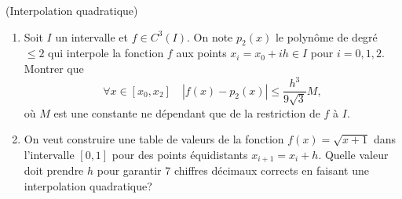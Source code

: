 \documentclass[a4paper,12pt,reqno]{amsart}
\begin{document}
\begin{exo} (Interpolation quadratique)
  \begin{enumerate}
    \item Soit $I$ un intervalle et $f\in C^3(I)$. On note $p_2(x)$ le polynôme de degré $\leq 2$ qui interpole la fonction $f$ aux points $x_i=x_0+ih \in I$ pour $i=0,1,2$. Montrer que
      $$
        \forall x\in [x_0, x_2] \quad
          | {f(x)-p_2(x)} | \leq \frac{h^3}{9\sqrt{3}}M,
      $$
    où $M$ est une constante ne dépendant que de la restriction de $f$ à $I$.

  \item On veut construire une table de valeurs de la fonction $f(x)=\sqrt{x+1}$ dans l'intervalle $[0,1]$ pour des points équidistants $x_{i+1}=x_i+h$.\newline
  Quelle valeur doit prendre $h$ pour garantir $7$ chiffres décimaux corrects en faisant une interpolation quadratique?
  \end{enumerate}
\end{exo}
\end{document}
